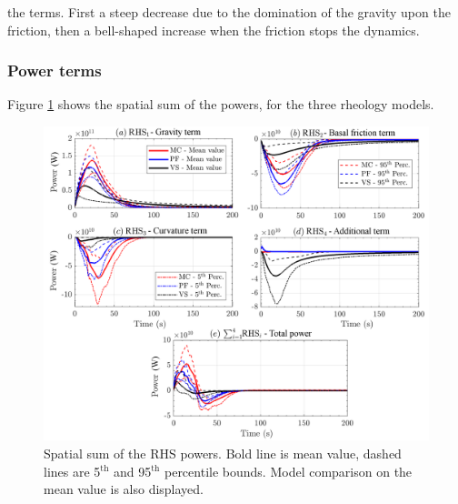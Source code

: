 \documentclass{article}
\begin{document}
the terms. First a steep decrease due to the domination of the gravity upon the friction, then a bell-shaped increase when the friction stops the dynamics.
\newpage
\subsubsection{Power terms}
Figure \ref{fig:Colima-Power-spatial} shows the spatial sum of the powers, for the three rheology models.
\begin{figure}[H]
        \centering
        \includegraphics[width=1\textwidth]{BAF_VolcanDeColima/AveragedMeasurments/PowersColima.png}
        \caption{Spatial sum of the RHS powers. Bold line is mean value, dashed lines are 5$^{\mathrm{th}}$ and 95$^{\mathrm{th}}$ percentile bounds. Model comparison on the mean value is also displayed.}
        \label{fig:Colima-Power-spatial}
\end{figure}
\end{document}
